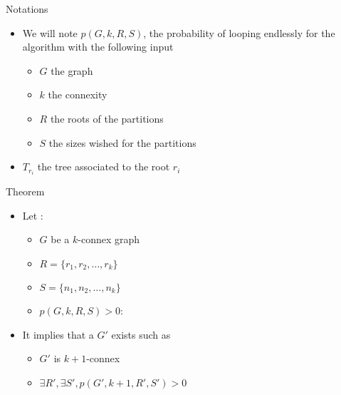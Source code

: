 
\begin{frame}{Notations}
  \begin{itemize}
  \item We will note $p(G,k,R,S)$, the probability
    of looping endlessly for the algorithm with the following input
    \begin{itemize}
      \item $G$ the graph
      \item $k$ the connexity
      \item $R$ the roots of the partitions
      \item $S$ the sizes wished for the partitions
    \end{itemize}
  \item $T_{r_i}$ the tree associated to the root $r_i$
  \end{itemize}
\end{frame}

\begin{frame}{Theorem}
  \begin{itemize}
  \item Let :
    \begin{itemize}
    \item $G$ be a $k$-connex graph
    \item $R = \{r_1,r_2, \dots, r_k\}$
    \item $S = \{n_1,n_2, \dots, n_k\}$
    \item $p(G,k,R,S) > 0$:
    \end{itemize}
  \item It implies that a $G'$ exists such as
    \begin{itemize}
    \item $G'$ is $k+1$-connex
    \item $\exists R', \exists S', p(G',k + 1, R', S') > 0$
    \end{itemize}
  \end{itemize}
\end{frame}

